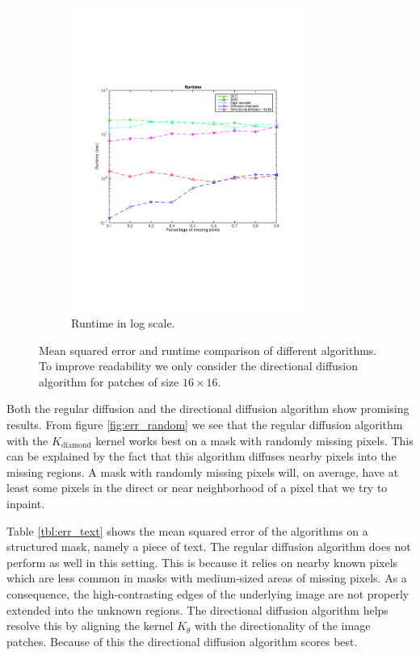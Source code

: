 \begin{figure}
\begin{subfigure}[b]{0.49\textwidth}
		\includegraphics[clip, trim=2cm 7cm 2cm 6cm, width=0.85\textwidth]{figures/runtime_vector}
		\caption{Runtime in log scale.}
		\label{fig:runtime}
	\end{subfigure}
	
	\caption{Mean squared error and runtime comparison of different algorithms. To improve readability we only consider the directional diffusion algorithm for patches of size $16 \times 16$.}
	\label{fig:rmd_results}
\end{figure}


Both the regular diffusion and the directional diffusion algorithm show promising results. From figure \ref{fig:err_random} we see that the regular diffusion algorithm with the $K_{\text{diamond}}$ kernel works best on a mask with randomly missing pixels. This can be explained by the fact that this algorithm diffuses nearby pixels into the missing regions. A mask with randomly missing pixels will, on average, have at least some pixels in the direct or near neighborhood of a pixel that we try to inpaint.

Table \ref{tbl:err_text} shows the mean squared error of the algorithms on a structured mask, namely a piece of text. The regular diffusion algorithm does not perform as well in this setting. This is because it relies on nearby known pixels which are less common in masks with medium-sized areas of missing pixels. As a consequence, the high-contrasting edges of the underlying image are not properly extended into the unknown regions. The directional diffusion algorithm helps resolve this by aligning the kernel  $K_{\theta}$ with the directionality of the image patches. Because of this the directional diffusion algorithm scores best.

